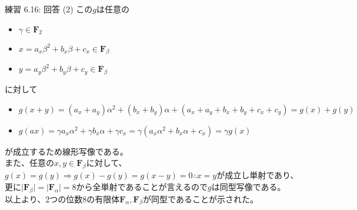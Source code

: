\documentclass[dvipdfmx,10pt,jsarticle]{beamer}
\begin{document}
  \begin{frame}{練習 6.16: 回答 (2)}
    この$g$は任意の
    \begin{itemize}
      \item $\gamma \in \mathbf{F}_2$
      \item $x = a_x \beta^2 + b_x \beta + c_x \in \mathbf{F}_\beta$
      \item $y = a_y \beta^2 + b_y \beta + c_y \in \mathbf{F}_\beta$
    \end{itemize}
    に対して
    \begin{itemize}
      \item $ g(x + y) = (a_x + a_y) \alpha^2 + (b_x + b_y) \alpha + (a_x + a_y + b_x + b_y + c_x + c_y) = g(x) + g(y) $
      \item $ g(a x) = \gamma a_x \alpha^2 + \gamma b_x \alpha + \gamma c_x = \gamma(a_x \alpha^2 + b_x \alpha + c_x) = \gamma g(x) $
    \end{itemize}
    が成立するため線形写像である。\\
    また、任意の$x,y \in \mathbf{F}_\beta$に対して、$g(x) = g(y) \Rightarrow g(x) - g(y) = g(x - y) = 0 \therefore x = y$が成立し単射であり、\\
    更に$\mid \mathbf{F}_\beta \mid = \mid \mathbf{F}_\alpha \mid = 8$から全単射であることが言えるので$g$は同型写像である。 \\
    以上より、2つの位数8の有限体$\mathbf{F}_\alpha, \mathbf{F}_\beta$が同型であることが示された。

  \end{frame}
\end{document}
